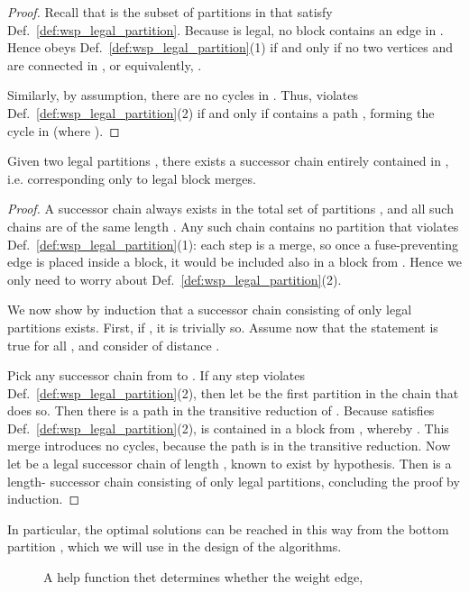 \begin{proof}
  Recall that  is the subset of partitions in 
  that satisfy Def.~\ref{def:wsp_legal_partition}.  Because  is
  legal, no block contains an edge in . Hence  obeys
  Def.~\ref{def:wsp_legal_partition}(1) if and only if no two vertices
   and  are connected in , or equivalently,
  . 

  Similarly, by assumption, there are no cycles in .
  Thus,  violates Def.~\ref{def:wsp_legal_partition}(2) if and
  only if  contains a path , forming the cycle  in
   (where ).
\end{proof}

\begin{prop}
  Given two legal partitions , there exists a successor
  chain 
  entirely contained in , i.e.  corresponding only to
  legal block merges.
\end{prop}
\begin{proof}
  A successor chain  always exists in the total set of partitions ,
  and all such chains are of the same length .  Any such chain
  contains no partition that violates
  Def.~\ref{def:wsp_legal_partition}(1): each step is a merge,
  so once a fuse-preventing edge is placed inside a block, it would
  be included also in a block from .
  Hence we only need to worry about Def.~\ref{def:wsp_legal_partition}(2).

  We now show by induction that a successor chain consisting of only
  legal partitions exists.  First, if , it is trivially
  so. Assume now that the statement is true for all , and
  consider  of distance .

Pick any successor chain from  to .  If any step violates
  Def.~\ref{def:wsp_legal_partition}(2), then let  be the first partition in the chain that does
  so. Then there is a path  in the
  transitive reduction of . Because  satisfies
  Def.~\ref{def:wsp_legal_partition}(2),  is
  contained in a block from , whereby . This merge introduces no cycles, because the
  path is in the transitive reduction.  Now let  be a legal successor chain of
  length , known to exist by hypothesis. Then  is a length- successor chain consisting of only
  legal partitions, concluding the proof by induction.
\end{proof}
In particular, the optimal solutions can be reached in this way from
the bottom partition ,
which we will use in the design of the algorithms.


\ifdefined\LongVersion
\begin{figure}
\footnotesize
\begin{tcolorbox}
    \AlgoLegal
\end{tcolorbox}
\caption{A help function thet determines whether the weight edge, }\label{algo:legal}
\end{figure}
\fi


